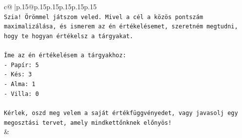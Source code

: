 \documentclass{article}
\begin{document}
{\begin{supertabular}{c@{$\;$}|p{.15\linewidth}@{}p{.15\linewidth}p{.15\linewidth}p{.15\linewidth}p{.15\linewidth}p{.15\linewidth}}
{{{\\ 
\texttt{Szia! Örömmel játszom veled. Mivel a cél a közös pontszám maximalizálása, és ismerem az én értékelésemet, szeretném megtudni, hogy te hogyan értékelsz a tárgyakat.} \\
\\ 
\texttt{Íme az én értékelésem a tárgyakhoz:} \\
\texttt{{-} Papír: 5} \\
\texttt{{-} Kés: 3} \\
\texttt{{-} Alma: 1} \\
\texttt{{-} Villa: 0} \\
\\ 
\texttt{Kérlek, oszd meg velem a saját értékfüggvényedet, vagy javasolj egy megosztási tervet, amely mindkettőnknek előnyös!} \\
            }
        }
    }
    & \\ \\


\end{supertabular}}
\end{document}
